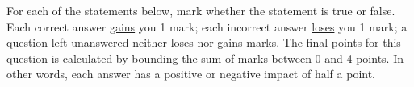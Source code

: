 
\pgfmathsetmacro{}

 For each of the statements below, mark whether the statement is true or false.  
Each correct answer \underline{gains} you 1 mark;
each incorrect answer \underline{loses} you 1 mark;
a question left unanswered neither loses nor gains marks.
The final points for this question is calculated by bounding the sum of marks between 0 and 4 points.  In other words, each answer has a positive or negative impact of half a point.

\ifx\questionFiveAnswerA\undefined\else{}\fi
\ifx\questionFiveAnswerA\undefined\else{}\fi
\ifx\questionFiveAnswerB\undefined\else{}\fi
\ifx\questionFiveAnswerB\undefined\else{}\fi
\ifx\questionFiveAnswerC\undefined\else{}\fi
\ifx\questionFiveAnswerC\undefined\else{}\fi
\ifx\questionFiveAnswerD\undefined\else{}\fi
\ifx\questionFiveAnswerD\undefined\else{}\fi
\ifx\questionFiveAnswerE\undefined\else{}\fi
\ifx\questionFiveAnswerE\undefined\else{}\fi
\ifx\questionFiveAnswerF\undefined\else{}\fi
\ifx\questionFiveAnswerF\undefined\else{}\fi
\ifx\questionFiveAnswerG\undefined\else{}\fi
\ifx\questionFiveAnswerG\undefined\else{}\fi
\ifx\questionFiveAnswerH\undefined\else{}\fi
\ifx\questionFiveAnswerH\undefined\else{}\fi


